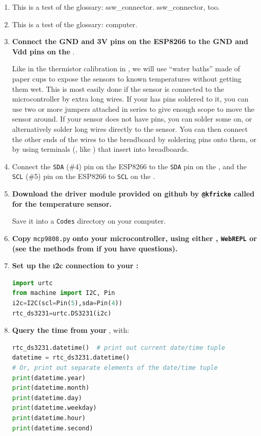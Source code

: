 \begin{enumerate}
	\item This is a test of the glossary: \gls{ssw_connector}. \Gls{ssw_connector}, too.
	\item This is a test of the glossary: \gls{computer}.

	\item \textbf{Connect the GND and 3V pins on the ESP8266 to the GND and Vdd pins on the }.

	Like in the thermistor calibration in , we will use ``water baths'' made of paper cups to expose the  sensors to known temperatures without getting them wet.
	This is most easily done if the sensor is connected to the microcontroller by extra long wires.
	If your  has pins soldered to it, you can use two or more jumpers attached in series to give enough scope to move the sensor around.
	If your sensor does not have pins, you can solder some on, or alternatively solder long wires directly to the sensor.
	You can then connect the other ends of the wires to the breadboard by soldering pins onto them, or by using terminals (\eg, like ) that insert into breadboards.

	\item Connect the \texttt{SDA} (\#4) pin on the ESP8266 to the \texttt{SDA} pin on the , and the  \texttt{SCL} (\#5) pin on the ESP8266 to \texttt{SCL} on the .
	\item \textbf{Download the driver module provided on github by \texttt{@kfricke} called  for the  temperature sensor.}

	Save it into a \texttt{Codes} directory on your computer.

	\item \textbf{Copy } \lstinline{mcp9808.py} \textbf{onto your microcontroller, using either \thonny, \texttt{WebREPL} or \mpfshell (see the methods from  if you have questions).}
	\item %
	\textbf{Set up the \i2c connection to your :}
\begin{lstlisting}[language=Python]
import urtc
from machine import I2C, Pin
i2c=I2C(scl=Pin(5),sda=Pin(4))
rtc_ds3231=urtc.DS3231(i2c)
\end{lstlisting}
	\item \textbf{Query the time from your }, with:
\begin{lstlisting}[language=Python]
rtc_ds3231.datetime()  # print out current date/time tuple
datetime = rtc_ds3231.datetime()
# Or, print out separate elements of the date/time tuple
print(datetime.year)
print(datetime.month)
print(datetime.day)
print(datetime.weekday)
print(datetime.hour)
print(datetime.second)
\end{lstlisting}
\end{enumerate}


